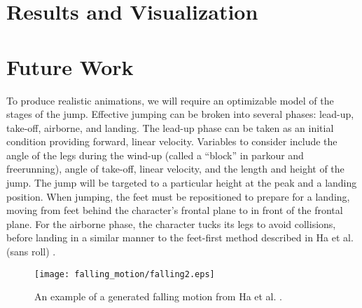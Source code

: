 \documentclass[landscape,26pt]{sciposter}
\begin{document}
\begin{minipage}[t]{14in}
	\section*{Results and Visualization}
		
	\section*{Future Work}
		To produce realistic animations, we will require an optimizable model of the stages of the jump.  Effective jumping can be broken into several phases: lead-up, take-off, airborne, and landing.  The lead-up phase can be taken as an initial condition providing forward, linear velocity.  Variables to consider include the angle of the legs during the wind-up (called a ``block'' in parkour and freerunning), angle of take-off, linear velocity, and the length and height of the jump.  The jump will be targeted to a particular height at the peak and a landing position.  When jumping, the feet must be repositioned to prepare for a landing, moving from feet behind the character's frontal plane to in front of the frontal plane.  For the airborne phase, the character tucks its legs to avoid collisions, before landing in a similar manner to the feet-first method described in Ha et al. (sans roll) \cite{falling_landing}.
		\vspace{0.3in}
		\begin{figure}
			\centering
			\texttt{[image: falling\_motion/falling2.eps]}
			\caption{An example of a generated falling motion from Ha et al. \cite{falling_landing}.}		
		\end{figure}
		
	\vspace{0.3in}

	{\small
	
	\nocite{muscle_based_bipeds}
	\nocite{anim_human_athletics}
	\nocite{composable_controllers}
	\nocite{soft_contacts}
	\nocite{falling_landing}
	\nocite{vball_footwork_block}
	\nocite{static_block_jumps}
	\nocite{inter_physics_anim}
	\nocite{opt_motion_synth}
	\nocite{motion_intentions}
	
	}
\end{minipage}
\end{document}
